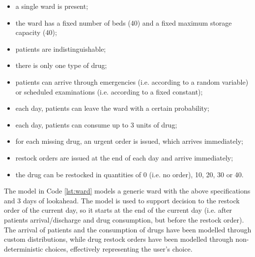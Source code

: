     \begin{itemize}
      \item a single ward is present;
      \item the ward has a fixed number of beds (40) and a fixed maximum storage capacity (40);
      \item patients are indistinguishable;
      \item there is only one type of drug;
      \item patients can arrive through emergencies (i.e. according to a random variable) or scheduled examinations (i.e. according to a fixed constant);
      \item each day, patients can leave the ward with a certain probability;
      \item each day, patients can consume up to 3 units of drug;
      \item for each missing drug, an urgent order is issued, which arrives immediately;
      \item restock orders are issued at the end of each day and arrive immediately;
      \item the drug can be restocked in quantities of 0 (i.e. no order), 10, 20, 30 or 40.
    \end{itemize}
    
    The model in Code \ref{lst:ward} models a generic ward with the above specifications and 3 days of lookahead. The model is used to support decision to the restock order of the current day, so it starts at the end of the current day (i.e. after patients arrival/discharge and drug consumption, but before the restock order). The arrival of patients and the consumption of drugs have been modelled through custom distributions, while drug restock orders have been modelled through non-deterministic choices, effectively representing the user's choice.
    
    \begin{center}
      
    \end{center}
    
